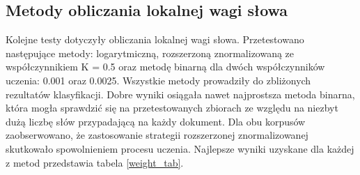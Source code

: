 \documentclass{pracamgr}
\begin{document}
\subsection{Metody obliczania lokalnej wagi słowa}

Kolejne testy dotyczyły obliczania lokalnej wagi słowa. Przetestowano następujące metody: logarytmiczną, rozszerzoną znormalizowaną ze współczynnikiem K = 0.5 oraz metodę binarną dla dwóch współczynników uczenia: 0.001 oraz 0.0025. Wszystkie metody prowadziły do zbliżonych rezultatów klasyfikacji. Dobre wyniki osiągała nawet najprostsza metoda binarna, która mogła sprawdzić się na przetestowanych zbiorach ze względu na niezbyt dużą liczbę słów przypadającą na każdy dokument. Dla obu korpusów zaobserwowano, że zastosowanie strategii rozszerzonej znormalizowanej skutkowało spowolnieniem procesu uczenia. Najlepsze wyniki uzyskane dla każdej z metod przedstawia tabela \ref{weight_tab}.

\begin{table}[]
\centering
{}
\caption{Porównanie najlepszych wyników klasyfikacji ze względu na metodę obliczania wagi i współczynnik uczenia}
\label{weight_tab}
\end{table}
\end{document}
